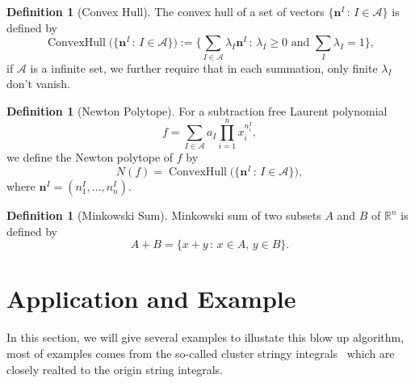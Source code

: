 \documentclass[12pt]{article}
\theoremstyle{definition}
\newtheorem{defi}[para]{Definition}
\theoremstyle{plain}
\begin{document}
\begin{defi}[Convex Hull]
The convex hull of a set of vectors $\{\mathbf n^I\,:\, I\in \mathscr A\}$ is defined by
\[
	\operatorname{ConvexHull}\bigl(\{\mathbf n^I\,:\, I\in \mathscr A\}\bigr)
	:=\Biggl\{\sum_{I\in\mathscr A}\lambda_I \mathbf n^I\,:\,
	\text{$\lambda_I\geq 0$ and $\sum_I\lambda_I=1$}\Biggr\},
\]
if $\mathscr A$ is a infinite set, we further require that in each summation, 
only finite $\lambda_I$ don't vanish.
\end{defi}

\begin{defi}[Newton Polytope]
For a subtraction free Laurent polynomial 
\[
	f = \sum_{I\in \mathscr A} a_I \prod_{i=1}^n x_i^{n^I_i},
\]
we define the Newton polytope of $f$ by
\[
	N(f)=\operatorname{ConvexHull}\bigl(\{\mathbf n^I\,:\, I\in \mathscr A\}\bigr),
\]
where $\mathbf n^I=(n^I_1,\dots,n^I_n)$. 
\end{defi}

\begin{defi}[Minkowski Sum]
Minkowski sum of two subsets $A$ and $B$ of $\mathbb R^n$ is defined by 
\[
	A+B=\{x+y\,:\,x\in A,\, y\in B\}.
\] 
\end{defi}



\section{Application and Example}

In this section, we will give several examples to illustate this blow up algorithm, most of examples comes from the so-called cluster stringy integrals~\cite{} which are closely realted to the origin string integrals.
\end{document}
